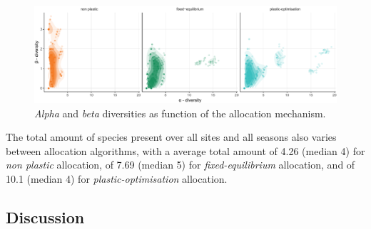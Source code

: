 \begin{figure}\label{fig:diversities}
\includegraphics[]{./2_PP/Figures/Comm/comm_div_differences_alpha_beta.pdf}
\caption[\textit{Alpha} and \textit{beta} diversities as function of the allocation mechanism.]{\textit{Alpha} and \textit{beta} diversities as function of the allocation mechanism.}
\end{figure}

The total amount of species present over all sites and all seasons also varies between allocation algorithms, with a average total amount of 4.26 (median 4) for \textit{non plastic} allocation, of 7.69 (median 5) for \textit{fixed-equilibrium} allocation, and of 10.1 (median 4) for \textit{plastic-optimisation} allocation.



\subsection{Discussion}



